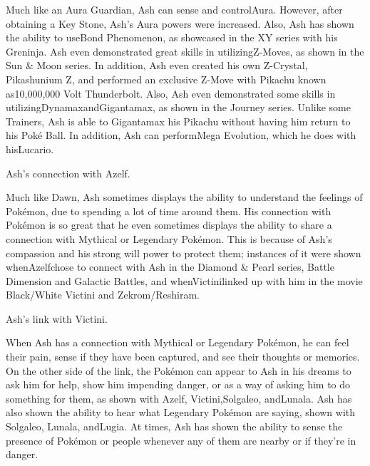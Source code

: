 \documentclass[a4paper,12pt]{article}
\begin{document}
Much like an Aura Guardian, Ash can sense and controlAura. However, after obtaining a Key Stone, Ash's Aura powers were increased. Also, Ash has shown the ability to useBond Phenomenon, as showcased in the XY series with his Greninja. Ash even demonstrated great skills in utilizingZ-Moves, as shown in the Sun & Moon series. In addition, Ash even created his own Z-Crystal, Pikashunium Z, and performed an exclusive Z-Move with Pikachu known as10,000,000 Volt Thunderbolt. Also, Ash even demonstrated some skills in utilizingDynamaxandGigantamax, as shown in the Journey series. Unlike some Trainers, Ash is able to Gigantamax his Pikachu without having him return to his Poké Ball. In addition, Ash can performMega Evolution, which he does with hisLucario.\\ \par \vspace{0.5cm}

Ash's connection with Azelf.\\ \par \vspace{0.5cm}

Much like Dawn, Ash sometimes displays the ability to understand the feelings of Pokémon, due to spending a lot of time around them. His connection with Pokémon is so great that he even sometimes displays the ability to share a connection with Mythical or Legendary Pokémon. This is because of Ash's compassion and his strong will power to protect them; instances of it were shown whenAzelfchose to connect with Ash in the Diamond & Pearl series, Battle Dimension and Galactic Battles, and whenVictinilinked up with him in the movie Black/White Victini and Zekrom/Reshiram.\\ \par \vspace{0.5cm}

Ash's link with Victini.\\ \par \vspace{0.5cm}

When Ash has a connection with Mythical or Legendary Pokémon, he can feel their pain, sense if they have been captured, and see their thoughts or memories. On the other side of the link, the Pokémon can appear to Ash in his dreams to ask him for help, show him impending danger, or as a way of asking him to do something for them, as shown with Azelf, Victini,Solgaleo, andLunala. Ash has also shown the ability to hear what Legendary Pokémon are saying, shown with Solgaleo, Lunala, andLugia. At times, Ash has shown the ability to sense the presence of Pokémon or people whenever any of them are nearby or if they're in danger.\\ \par \vspace{0.5cm}
\end{document}
